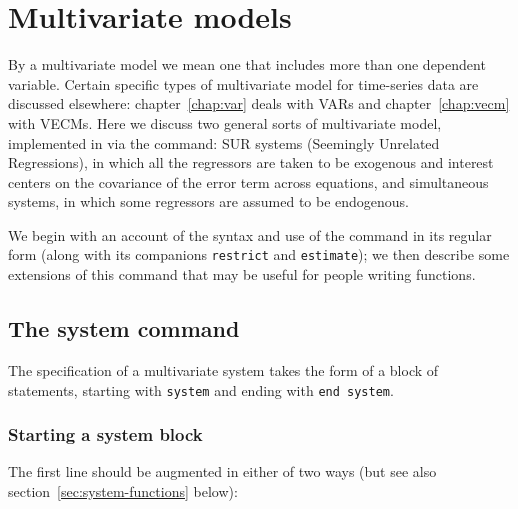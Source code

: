 \chapter{Multivariate models}
\label{chap:system}

By a multivariate model we mean one that includes more than one
dependent variable. Certain specific types of multivariate model for
time-series data are discussed elsewhere: chapter~\ref{chap:var} deals
with VARs and chapter~\ref{chap:vecm} with VECMs. Here we discuss two
general sorts of multivariate model, implemented in  via
the  command: SUR systems (Seemingly Unrelated
Regressions), in which all the regressors are taken to be exogenous
and interest centers on the covariance of the error term across
equations, and simultaneous systems, in which some regressors are
assumed to be endogenous.

We begin with an account of the syntax and use of the 
command in its regular form (along with its companions
\texttt{restrict} and \texttt{estimate}); we then describe some
extensions of this command that may be useful for people writing
functions.

\section{The system command}
\label{sec:system-regular}

The specification of a multivariate system takes the form of a block
of statements, starting with \texttt{system} and ending with
\texttt{end system}. 

\subsection{Starting a system block}

The first line should be augmented in either of two ways (but see also
section~\ref{sec:system-functions} below):

